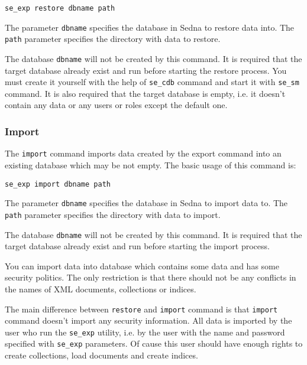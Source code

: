 \documentclass[a4paper,12pt]{article}
\begin{document}
\begin{verbatim}
se_exp restore dbname path
\end{verbatim}

The parameter \verb!dbname! specifies the database in Sedna to restore data into. The \verb!path!
parameter specifies the directory with data to restore.

The database \verb!dbname! will not be created by this command. It is required that the target database
already exist and run before starting the restore process. You must create it yourself with the help
of \verb!se_cdb! command and start it with \verb!se_sm! command. It is also required that the target
database is empty, i.e. it doesn't contain any data or any users or roles except the default one.




\subsubsection*{Import}

The \verb!import! command imports data created by the export command into an existing database
which may be not empty. The basic usage of this command is:

\begin{verbatim}
se_exp import dbname path
\end{verbatim}

The parameter \verb!dbname! specifies the database in Sedna to import data to. The \verb!path!
parameter specifies the directory with data to import.

The database \verb!dbname! will not be created by this command. It is required that the target database
already exist and run before starting the import process.

You can import data into database which contains some data and has some security politics. The only
restriction is that there should not be any conflicts in the names of XML documents, collections or
indices.

The main difference between \verb!restore! and \verb!import! command is that \verb!import! command
doesn't import any security information. All data is imported by the user who run the \verb!se_exp!
utility, i.e. by the user with the name and password specified with \verb!se_exp! parameters. Of cause
this user should have enough rights to create collections, load documents and create indices.
\end{document}
